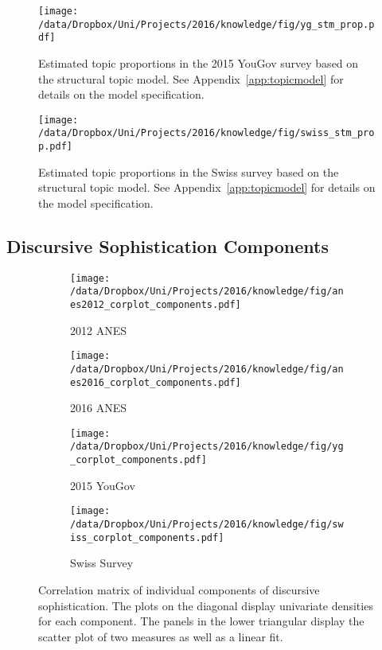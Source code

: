 \begin{figure}[h]\centering
\texttt{[image: /data/Dropbox/Uni/Projects/2016/knowledge/fig/yg\_stm\_prop.pdf]}
\caption[Estimated topic proportions in the 2015 YouGov survey based on the structural topic model]{Estimated topic proportions in the 2015 YouGov survey based on the structural topic model. See Appendix~\ref{app:topicmodel} for details on the model specification.}\label{fig:yg_stm_prop}
\end{figure}

\begin{figure}[h]\centering
\texttt{[image: /data/Dropbox/Uni/Projects/2016/knowledge/fig/swiss\_stm\_prop.pdf]}
\caption[Estimated topic proportions in the Swiss survey based on the structural topic model]{Estimated topic proportions in the Swiss survey based on the structural topic model. See Appendix~\ref{app:topicmodel} for details on the model specification.}\label{fig:swiss_stm_prop}
\end{figure}


\clearpage
\subsection{Discursive Sophistication Components}
\begin{figure*}[h]
    \centering
    \begin{subfigure}[h]{0.4\textwidth}
        \centering
        \texttt{[image: /data/Dropbox/Uni/Projects/2016/knowledge/fig/anes2012\_corplot\_components.pdf]}
        \caption{2012 ANES}
    \end{subfigure}%
    \begin{subfigure}[h]{0.4\textwidth}
         \centering
         \texttt{[image: /data/Dropbox/Uni/Projects/2016/knowledge/fig/anes2016\_corplot\_components.pdf]}
         \caption{2016 ANES}
    \end{subfigure}%
    
    \begin{subfigure}[h]{0.4\textwidth}
        \centering
        \texttt{[image: /data/Dropbox/Uni/Projects/2016/knowledge/fig/yg\_corplot\_components.pdf]}
        \caption{2015 YouGov}
    \end{subfigure}%
    \begin{subfigure}[h]{0.4\textwidth}
         \centering
         \texttt{[image: /data/Dropbox/Uni/Projects/2016/knowledge/fig/swiss\_corplot\_components.pdf]}
         \caption{Swiss Survey}
    \end{subfigure}
    \caption[Correlation matrix of individual components of discursive sophistication.]{Correlation matrix of individual components of discursive sophistication. The plots on the diagonal display univariate densities for each component. The panels in the lower triangular display the scatter plot of two measures as well as a linear fit. %
     }\label{fig:components}
\end{figure*}


